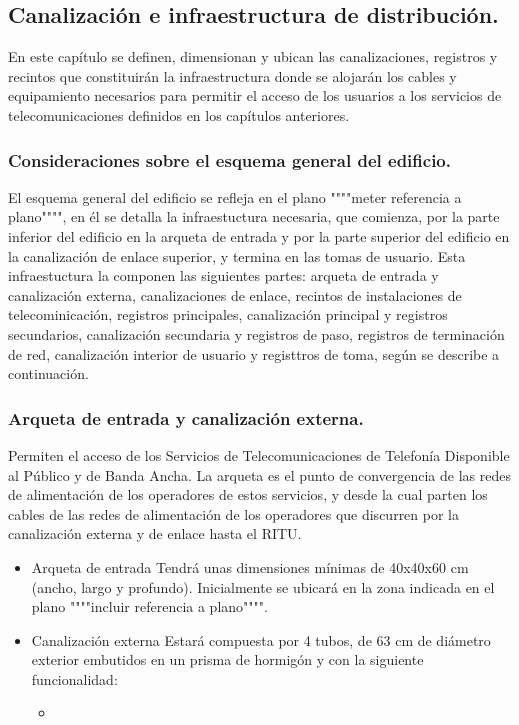\subsection{Canalización e infraestructura de distribución.}
En este capítulo se definen, dimensionan y ubican las canalizaciones, registros y recintos que constituirán la infraestructura donde se alojarán los cables y equipamiento necesarios para permitir el acceso de los usuarios a los servicios de telecomunicaciones definidos en los capítulos anteriores.
\subsubsection{Consideraciones sobre el esquema general del edificio.}
El esquema general del edificio se refleja en el plano """"meter referencia a plano"""", en él se detalla la infraestuctura necesaria, que comienza, por la parte inferior del edificio en la arqueta de entrada y por la parte superior del edificio en la canalización de enlace superior, y termina en las tomas de usuario. Esta infraestuctura la componen las siguientes partes: arqueta de entrada y canalización externa, canalizaciones de enlace, recintos de instalaciones de telecominicación, registros principales, canalización principal y registros secundarios, canalización secundaria y registros de paso, registros de terminación de red, canalización interior de usuario y registtros de toma, según se describe a continuación.
\subsubsection{Arqueta de entrada y canalización externa.}
Permiten el acceso de los Servicios de Telecomunicaciones de Telefonía Disponible al Público y de Banda Ancha. La arqueta es el punto de convergencia de las redes de alimentación de los operadores de estos servicios, y desde la cual parten los cables de las redes de alimentación de los operadores que discurren por la canalización externa y de enlace hasta el RITU.
\begin{itemize}
	\item Arqueta de entrada
	Tendrá unas dimensiones mínimas de 40x40x60 cm (ancho, largo y profundo). Inicialmente se ubicará en la zona indicada en el plano """"incluir referencia a plano"""".
	
	\item Canalización externa
	Estará compuesta por 4 tubos, de 63 cm de diámetro exterior embutidos en un prisma de hormigón y con la siguiente funcionalidad:
	\begin{itemize}
	\item 
\end{itemize}
\end{itemize}
